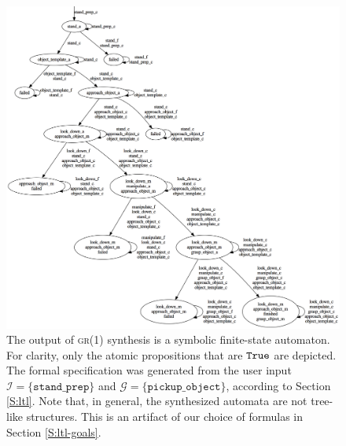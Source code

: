 \begin{figure}[t]
\centering
\includegraphics[width=0.95\columnwidth,clip]{./img/synthesized_automaton.png}
\caption{
	The output of \textsc{gr(1)} synthesis is a symbolic finite-state automaton.
	For clarity, only the atomic propositions that are $\mathtt{True}$ are depicted.
	The formal specification was generated from the user input $\mathcal{I} = \{ \mathtt{stand\_prep} \}$ and $\mathcal{G} = \{ \mathtt{pickup\_object} \}$, according to Section \ref{S:ltl}.
	Note that, in general, the synthesized automata are not tree-like structures.
	This is an artifact of our choice of formulas in Section \ref{S:ltl-goals}.
}
\label{Fig:SynthesizedAutomaton}
\end{figure}

